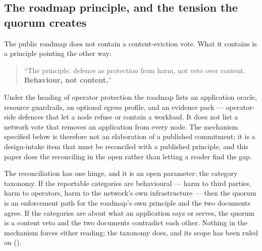 \subsection{The roadmap principle, and the tension the quorum creates}
\label{sec:23:c5}

The public roadmap does not contain a content-eviction vote. What it contains is a principle
pointing the other way:

\begin{quote}
``The principle: defence as protection from harm, not veto over content. \textbf{Behaviour, not
content.}'' 
\end{quote}

Under the heading of operator protection the roadmap lists an application oracle, resource
guardrails, an optional egress profile, and an evidence pack — operator-side defences that let a
node refuse or contain a workload. It does not list a network vote that removes an application from
every node. The mechanism specified below is therefore not an elaboration of a published
commitment; it is a design-intake item  that must be
reconciled with a published principle, and this paper does the reconciling in the open rather than
letting a reader find the gap.

The reconciliation has one hinge, and it is an open parameter: the category taxonomy. If the
reportable categories are behavioural — harm to third parties, harm to operators, harm to the
network's own infrastructure — then the quorum is an enforcement path for the roadmap's own
principle and the two documents agree. If the categories are about what an application says or
serves, the quorum is a content veto and the two documents contradict each other. Nothing in the
mechanism forces either reading; the taxonomy does, and its scope has been ruled on
().

